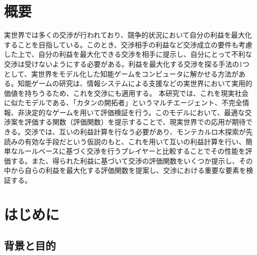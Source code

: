 \documentclass[a4, 10pt,dvipdfmx]{jsarticle}
\begin{document}
\makecover


\tableofcontents

\newpage


\section*{概要} 

実世界では多くの交渉が行われており、競争的状況において自分の利益を最大化することを目指している。このとき、交渉相手の利益など交渉成立の要件も考慮した上で、自分の利益を最大化できる交渉を相手に提示し、自分にとって不利な交渉は受けないようにする必要がある。利益を最大化する交渉を探る手法の1つとして、実世界をモデル化した知能ゲームをコンピュータに解かせる方法がある。知能ゲームの研究は、情報システムによる支援などの実世界において実用的価値を持ちうるため、これを交渉にも適用する。
本研究では、これを現実社会に似たモデルである、「カタンの開拓者」というマルチエージェント、不完全情報、非決定的なゲームを用いて評価検証を行う。このモデルにおいて、最適な交渉案を評価する関数（評価関数）を提示することで、現実世界での応用が期待できる。交渉では、互いの利益計算を行なう必要があり、モンテカルロ木探索が先読みの有効な手段だという仮説のもと、これを用いて互いの利益計算を行い、簡単なルールベースに基づく交渉を行うプレイヤーと比較することでその性能を評価する。また、得られた利益に基づいて交渉の評価関数をいくつか提示し、その中から自らの利益を最大化する評価関数を提案し、交渉における重要な要素を検証する。


\section{はじめに}

\subsection{背景と目的}
\end{document}
